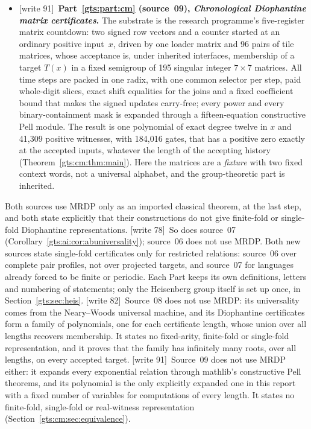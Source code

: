 \documentclass[11pt,letterpaper]{article}
\theoremstyle{definition}
\theoremstyle{remark}
\newcommand{\wtagb}{\textup{[write 78]}}
\newcommand{\wtagc}{\textup{[write 82]}}
\newcommand{\wtagd}{\textup{[write 91]}}
\begin{document}
\begin{itemize}
\item \wtagd\ \textbf{Part~\ref{gts:part:cm} (source~09), \emph{Chronological Diophantine matrix certificates}.} The substrate is the research programme's five-register matrix countdown: two signed row vectors and a counter started at an ordinary positive input~$x$, driven by one loader matrix and 96 pairs of tile matrices, whose acceptance is, under inherited interfaces, membership of a target $T(x)$ in a fixed semigroup of 195 singular integer $7\times7$ matrices. All time steps are packed in one radix, with one common selector per step, paid whole-digit slices, exact shift equalities for the joins and a fixed coefficient bound that makes the signed updates carry-free; every power and every binary-containment mask is expanded through a fifteen-equation constructive Pell module. The result is one polynomial of exact degree twelve in $x$ and 41,309 positive witnesses, with 184,016 gates, that has a positive zero exactly at the accepted inputs, whatever the length of the accepting history (Theorem~\ref{gts:cm:thm:main}). Here the matrices are a \emph{fixture} with two fixed context words, not a universal alphabet, and the group-theoretic part is inherited.
\end{itemize}

Both sources use MRDP only as an imported classical theorem, at the last step, and both state explicitly that their constructions do not give finite-fold or single-fold Diophantine representations. \wtagb\ So does source~07 (Corollary~\ref{gts:ai:cor:abuniversality}); source~06 does not use MRDP. Both new sources state single-fold certificates only for restricted relations: source~06 over complete pair profiles, not over projected targets, and source~07 for languages already forced to be finite or periodic. Each Part keeps its own definitions, letters and numbering of statements; only the Heisenberg group itself is set up once, in Section~\ref{gts:sec:heis}. \wtagc\ Source~08 does not use MRDP: its universality comes from the Neary--Woods universal machine, and its Diophantine certificates form a family of polynomials, one for each certificate length, whose union over all lengths recovers membership. It states no fixed-arity, finite-fold or single-fold representation, and it proves that the family has infinitely many roots, over all lengths, on every accepted target. \wtagd\ Source~09 does not use MRDP either: it expands every exponential relation through mathlib's constructive Pell theorems, and its polynomial is the only explicitly expanded one in this report with a fixed number of variables for computations of every length. It states no finite-fold, single-fold or real-witness representation (Section~\ref{gts:cm:sec:equivalence}).
\end{document}
